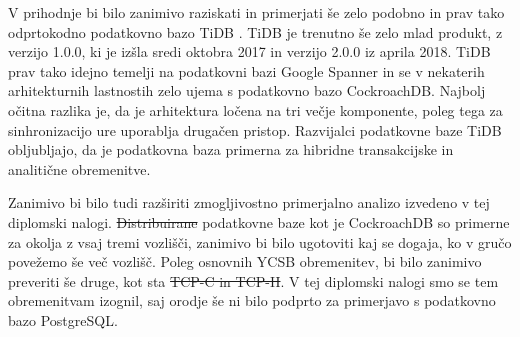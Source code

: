\documentclass[a4paper, 12pt]{book}
\providecommand{\DIFaddtex}[1]{{\protect\color{blue}\uwave{#1}}} %
\providecommand{\DIFdeltex}[1]{{\protect\color{red}\sout{#1}}}                      %
\providecommand{\DIFaddbegin}{} %
\providecommand{\DIFaddend}{} %
\providecommand{\DIFdelbegin}{} %
\providecommand{\DIFdelend}{} %
\providecommand{\DIFadd}[1]{\texorpdfstring{\DIFaddtex{#1}}{#1}} %
\providecommand{\DIFdel}[1]{\texorpdfstring{\DIFdeltex{#1}}{}} %
\newcommand{\DIFscaledelfig}{0.5}
\newlength{\DIFdelgraphicswidth} %
\newlength{\DIFdelgraphicsheight} %
\newcommand{\DIFaddincludegraphics}[2][]{{\color{blue}\fbox{\DIFOincludegraphics[#1]{#2}}}} %
\newcommand{\DIFdelincludegraphics}[2][]{%
\sbox{\DIFdelgraphicsbox}{\DIFOincludegraphics[#1]{#2}}%
\settoboxwidth{\DIFdelgraphicswidth}{\DIFdelgraphicsbox} %
\settoboxtotalheight{\DIFdelgraphicsheight}{\DIFdelgraphicsbox} %
\scalebox{\DIFscaledelfig}{%
\parbox[b]{\DIFdelgraphicswidth}{\usebox{\DIFdelgraphicsbox}\\[-\baselineskip] \rule{\DIFdelgraphicswidth}{0em}}\llap{\resizebox{\DIFdelgraphicswidth}{\DIFdelgraphicsheight}{%
\setlength{\unitlength}{\DIFdelgraphicswidth}%
\begin{picture}(1,1)%
\thicklines\linethickness{2pt} %
{\color[rgb]{1,0,0}\put(0,0){\framebox(1,1){}}}%
{\color[rgb]{1,0,0}\put(0,0){\line( 1,1){1}}}%
{\color[rgb]{1,0,0}\put(0,1){\line(1,-1){1}}}%
\end{picture}%
}\hspace*{3pt}}} %
} %
\DeclareRobustCommand{\DIFaddbegin}{\DIFOaddbegin \let\includegraphics\DIFaddincludegraphics} %
\DeclareRobustCommand{\DIFaddend}{\DIFOaddend \let\includegraphics\DIFOincludegraphics} %
\DeclareRobustCommand{\DIFdelbegin}{\DIFOdelbegin \let\includegraphics\DIFdelincludegraphics} %
\DeclareRobustCommand{\DIFdelend}{\DIFOaddend \let\includegraphics\DIFOincludegraphics} %
\begin{document}
V prihodnje bi bilo zanimivo raziskati in primerjati še zelo podobno in prav tako odprtokodno podatkovno bazo TiDB \cite{PingCAP-home}. TiDB je trenutno še zelo mlad produkt, z verzijo 1.0.0, ki je izšla sredi oktobra 2017 in verzijo 2.0.0 iz aprila 2018. TiDB prav tako idejno temelji na podatkovni bazi Google Spanner in se v nekaterih arhitekturnih lastnostih zelo ujema s podatkovno bazo CockroachDB. Najbolj očitna razlika je, da je arhitektura ločena na tri večje komponente, poleg tega za sinhronizacijo ure uporablja drugačen pristop. Razvijalci podatkovne baze TiDB obljubljajo, da je podatkovna baza primerna za hibridne transakcijske in analitične obremenitve.

Zanimivo bi bilo tudi razširiti zmogljivostno primerjalno analizo izvedeno v tej diplomski nalogi. \DIFdelbegin \DIFdel{Distribuirane }\DIFdelend \DIFaddbegin \DIFadd{Porazdeljene }\DIFaddend podatkovne baze kot je CockroachDB so primerne za okolja z vsaj tremi vozlišči, zanimivo bi bilo ugotoviti kaj se dogaja, ko v gručo povežemo še več vozlišč. Poleg osnovnih YCSB obremenitev, bi bilo zanimivo preveriti še druge, kot sta \DIFdelbegin \DIFdel{TCP-C in TCP-H}\DIFdelend \DIFaddbegin \DIFadd{TPC-C in TPC-H}\DIFaddend . V tej diplomski nalogi smo se tem obremenitvam izognil, saj orodje \cite{cockroachdb/loadgen} še ni bilo podprto za primerjavo s podatkovno bazo PostgreSQL.


\newpage %
\ \\
\clearpage
{}


\end{document}
